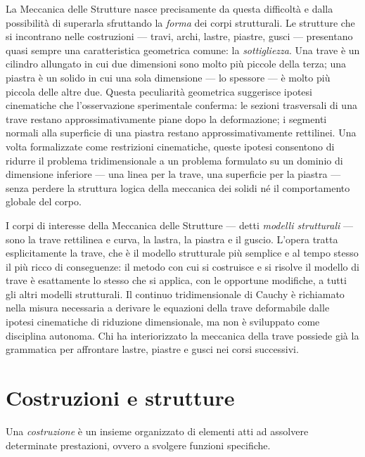La Meccanica delle Strutture nasce precisamente da questa difficoltà e dalla possibilità di superarla sfruttando la \textit{forma} dei corpi strutturali. Le strutture che si incontrano nelle costruzioni --- travi, archi, lastre, piastre, gusci --- presentano quasi sempre una caratteristica geometrica comune: la \textit{sottigliezza}. Una trave è un cilindro allungato in cui due dimensioni sono molto più piccole della terza; una piastra è un solido in cui una sola dimensione --- lo spessore --- è molto più piccola delle altre due. Questa peculiarità geometrica suggerisce ipotesi cinematiche che l'osservazione sperimentale conferma: le sezioni trasversali di una trave restano approssimativamente piane dopo la deformazione; i segmenti normali alla superficie di una piastra restano approssimativamente rettilinei. Una volta formalizzate come restrizioni cinematiche, queste ipotesi consentono di ridurre il problema tridimensionale a un problema formulato su un dominio di dimensione inferiore --- una linea per la trave, una superficie per la piastra --- senza perdere la struttura logica della meccanica dei solidi né il comportamento globale del corpo.

I corpi di interesse della Meccanica delle Strutture --- detti \textit{modelli strutturali} --- sono la trave rettilinea e curva, la lastra, la piastra e il guscio. L'opera tratta esplicitamente la trave, che è il modello strutturale più semplice e al tempo stesso il più ricco di conseguenze: il metodo con cui si costruisce e si risolve il modello di trave è esattamente lo stesso che si applica, con le opportune modifiche, a tutti gli altri modelli strutturali. Il continuo tridimensionale di Cauchy è richiamato nella misura necessaria a derivare le equazioni della trave deformabile dalle ipotesi cinematiche di riduzione dimensionale, ma non è sviluppato come disciplina autonoma. Chi ha interiorizzato la meccanica della trave possiede già la grammatica per affrontare lastre, piastre e gusci nei corsi successivi.

\section{Costruzioni e strutture}

\begin{definizione}[Costruzione]
	Una \emph{costruzione} è un insieme organizzato di 	elementi atti ad assolvere determinate prestazioni,	ovvero a svolgere funzioni specifiche.
\end{definizione}

